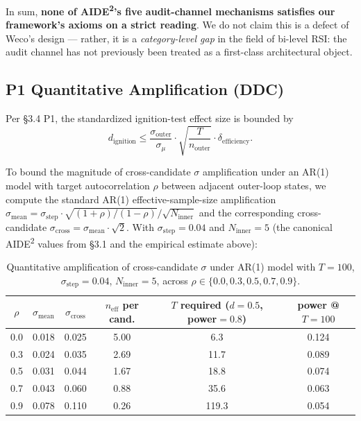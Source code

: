 \documentclass{article}
\theoremstyle{definition}
\begin{document}
In sum, \textbf{none of AIDE\textsuperscript{2}'s five audit-channel mechanisms satisfies our framework's axioms on a strict reading}. We do not claim this is a defect of Weco's design --- rather, it is a \emph{category-level gap} in the field of bi-level RSI: the audit channel has not previously been treated as a first-class architectural object.

\subsection{P1 Quantitative Amplification (DDC)}

Per \S3.4 P1, the standardized ignition-test effect size is bounded by
\[
d_{\text{ignition}} \le \frac{\sigma_{\text{outer}}}{\sigma_\mu} \cdot \sqrt{\frac{T}{n_{\text{outer}}}} \cdot \delta_{\text{efficiency}}.
\]

To bound the magnitude of cross-candidate $\sigma$ amplification under an AR(1) model with target autocorrelation $\rho$ between adjacent outer-loop states, we compute the standard AR(1) effective-sample-size amplification $\sigma_{\text{mean}} = \sigma_{\text{step}} \cdot \sqrt{(1+\rho)/(1-\rho)} / \sqrt{N_{\text{inner}}}$ and the corresponding cross-candidate $\sigma_{\text{cross}} = \sigma_{\text{mean}} \cdot \sqrt{2}$. With $\sigma_{\text{step}} = 0.04$ and $N_{\text{inner}} = 5$ (the canonical AIDE\textsuperscript{2} values from \S3.1 and the empirical estimate above):

\begin{table}[h]
\centering
\caption{Quantitative amplification of cross-candidate $\sigma$ under AR(1) model with $T = 100$, $\sigma_{\text{step}} = 0.04$, $N_{\text{inner}} = 5$, across $\rho \in \{0.0, 0.3, 0.5, 0.7, 0.9\}$.}
\label{tab:ddc-amplification}
\begin{tabular}{cccccc}
\toprule
$\rho$ & $\sigma_{\text{mean}}$ & $\sigma_{\text{cross}}$ & $n_{\text{eff}}$ per cand. & $T$ required ($d=0.5$, power$=0.8$) & power @ $T=100$ \\
\midrule
0.0 & 0.018 & 0.025 & 5.00 & 6.3 & 0.124 \\
0.3 & 0.024 & 0.035 & 2.69 & 11.7 & 0.089 \\
0.5 & 0.031 & 0.044 & 1.67 & 18.8 & 0.074 \\
0.7 & 0.043 & 0.060 & 0.88 & 35.6 & 0.063 \\
0.9 & 0.078 & 0.110 & 0.26 & 119.3 & 0.054 \\
\bottomrule
\end{tabular}
\end{table}
\end{document}
